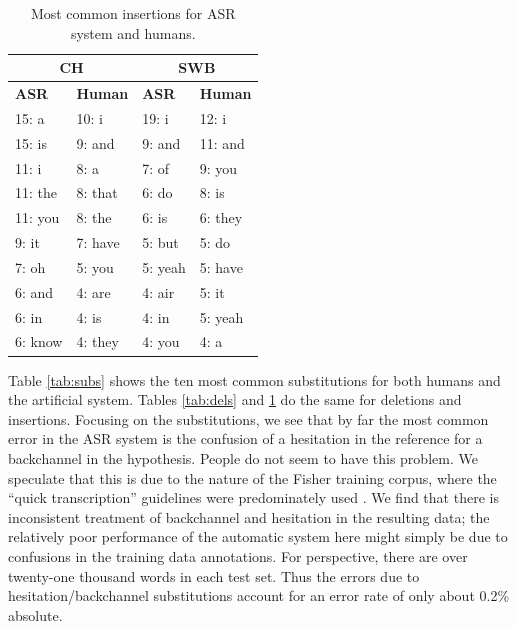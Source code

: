 \documentclass{article}
\begin{document}
\begin{table}[t]
    \centering
\caption{Most common insertions for ASR system and humans.}
\vspace*{0.1in}
\label{tab:ins}
        \small
    \begin{tabular}{|l|l||l|l|}
    \hline
    \multicolumn{2}{|c||}{{\bf CH}} & \multicolumn{2}{c|}{{\bf SWB}} \\ \hline 
                    {\bf ASR}   & {\bf Human}   & {\bf ASR}   & {\bf Human}  \\ \hline \hline
15:  a &    10:  i &    19:  i &    12:  i \\ \hline
      15:  is &        9:  and &        9:  and &       11:  and \\ \hline
      11:  i &        8:  a &        7:  of &        9:  you \\ \hline
      11:  the &        8:  that &        6:  do &        8:  is \\ \hline
      11:  you &        8:  the &        6:  is &        6:  they \\ \hline
       9:  it &        7:  have &        5:  but &        5:  do \\ \hline
       7:  oh &        5:  you &        5:  yeah &        5:  have \\ \hline
       6:  and &        4:  are &        4:  air &        5:  it \\ \hline
       6:  in &        4:  is &        4:  in &        5:  yeah \\ \hline
      6:  know &       4:  they &       4:  you &     4:  a \\ \hline
        \end{tabular}
\end{table}
Table \ref{tab:subs} shows the ten most common substitutions for both
humans and the artificial system. Tables \ref{tab:dels} and \ref{tab:ins}
do the same for deletions and insertions. Focusing on the substitutions,
we see that by far the most common error in the ASR system is the confusion
of a hesitation in the reference for a backchannel in the hypothesis.
People do not seem to have this problem.  We speculate that this is due
to the nature of the Fisher training corpus, where the ``quick transcription''
guidelines were predominately used \cite{glenn2010transcription}. 
We find that there is inconsistent treatment of backchannel and hesitation
in the resulting data; the relatively poor performance of the 
automatic system here might simply 
be due to confusions in the training data annotations.
For perspective, there are over twenty-one thousand words in each 
test set. Thus the errors due to hesitation/backchannel substitutions account
for an error rate of only about 0.2\% absolute.
 
\end{document}
